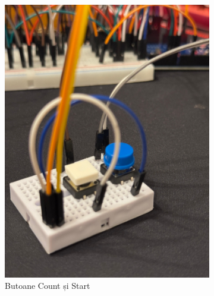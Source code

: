 \begin{figure}[h!]
\begin{subfigure}[b]{0.3\textwidth}
      \includegraphics[width=\textwidth]{figures/2.jpg}
      \caption{Butoane Count și Start}
  \end{subfigure}
  \hfill
  \begin{subfigure}[b]{0.3\textwidth} %

\end{subfigure}
\end{figure}
